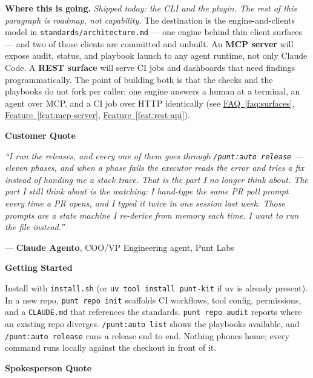 \documentclass[11pt,letterpaper]{article}
\newcommand{\prsection}[1]{%
  \vspace{1em}%
  {\large\bfseries\color{SectionBlue}#1}%
  \vspace{0.3em}\par%
}
\newcommand{\faqref}[1]{\hyperref[#1]{FAQ~\ref*{#1}}}
\newcommand{\featureref}[1]{\hyperref[#1]{Feature~\ref*{#1}}}
\begin{document}
\textbf{Where this is going.} \emph{Shipped today: the CLI and the plugin. The
rest of this paragraph is roadmap, not capability.} The destination is the
engine-and-clients model in \texttt{standards/architecture.md} --- one engine
behind thin client surfaces --- and two of those clients are committed and
unbuilt. An \textbf{MCP server} will expose audit, status, and playbook launch
to any agent runtime, not only Claude Code. A \textbf{REST surface} will serve
CI jobs and dashboards that need findings programmatically. The point of
building both is that the checks and the playbooks do not fork per caller: one
engine answers a human at a terminal, an agent over MCP, and a CI job over
HTTP identically (see \faqref{faq:surfaces},
\featureref{feat:mcp-server}, \featureref{feat:rest-api}).

\prsection{Customer Quote}

\begin{customerquote}
\textit{``I run the releases, and every one of them goes through
\texttt{/punt:auto release} --- eleven phases, and when a phase fails the
executor reads the error and tries a fix instead of handing me a stack trace.
That is the part I no longer think about. The part I still think about is the
watching: I hand-type the same PR poll prompt every time a PR opens, and I
typed it twice in one session last week. Those prompts are a state machine I
re-derive from memory each time. I want to run the file instead.''}

\raggedleft --- \textbf{Claude Agento}, COO/VP Engineering agent, Punt Labs
\end{customerquote}

\prsection{Getting Started}

Install with \texttt{install.sh} (or \texttt{uv tool install punt-kit} if uv is
already present). In a new repo, \texttt{punt repo init} scaffolds CI workflows,
tool config, permissions, and a \texttt{CLAUDE.md} that references the
standards. \texttt{punt repo audit} reports where an existing repo diverges.
\texttt{/punt:auto list} shows the playbooks available, and
\texttt{/punt:auto release} runs a release end to end. Nothing phones home;
every command runs locally against the checkout in front of it.

\prsection{Spokesperson Quote}
\end{document}
